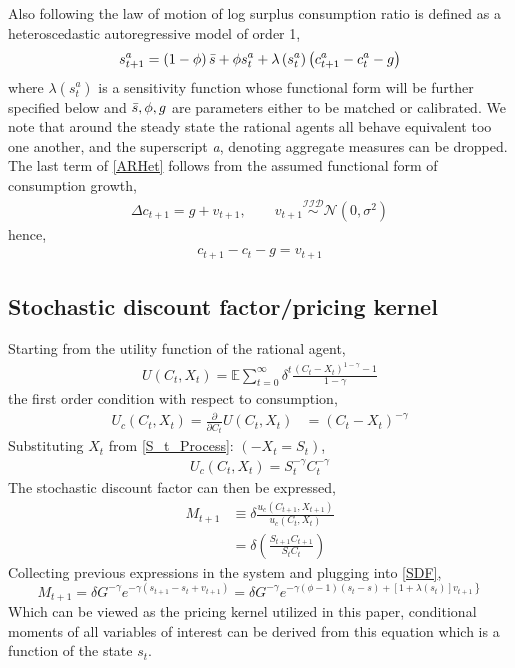 Also following \citet{Campbell1999} the law of motion of log surplus consumption ratio is defined as a heteroscedastic autoregressive model of order 1,
\begin{align}
    s_{t+1}^a  = \left( 1-\phi  \right)\Bar{s}+ \phi s_t ^ a + \lambda \left( s_t ^a  \right)\left( c_{t+1}^a - c_t^a - g\right) \label{ARHet}
\end{align}
where $\lambda(s_t^a)$ is a sensitivity function whose functional form will be further specified below and $\Bar{s},\phi, g$ are parameters either to be matched or calibrated. We note that around the steady state the rational agents all behave equivalent too one another, and the superscript \textit{a}, denoting aggregate measures can be dropped.
The last term of \eqref{ARHet} follows from the assumed functional form of consumption growth,
\begin{align}
    \Delta c_{t+1} = g + v_{t+1}, \qquad v_{t+1}\overset{\mathcal{IID}}{\sim}\mathcal{N}\left(0, \sigma^2 \right) \label{DConos}
\end{align}
hence,
\begin{align}
     c_{t+1} - c_t - g = v_{t+1}
\end{align}
\subsection{Stochastic discount factor/pricing kernel}
Starting from the utility function of the rational agent,
\begin{align*}
    U(C_t, X_t) = \mathbb{E} \sum _ {t = 0} ^{\infty} \delta ^ t \frac{\left( C_t - X_t\right)^{1-\gamma } - 1}{1-\gamma }
\end{align*}
the first order condition with respect to consumption,
\begin{align*}
    U_c \left( C_t, X_t \right) = \frac{\partial}{\partial C_t} U(C_t, X_t) & = \left( C_t - X_t\right)^{-\gamma}
\end{align*}
Substituting $X_t$ from \eqref{S_t_Process}:  $(-X_t = S_t)$,
\begin{align}
     U_c \left( C_t, X_t \right) = S_t ^{-\gamma} C_t ^{-\gamma}
\end{align}
The stochastic discount factor can then be expressed,
\begin{align}
    M_{t+1} & \equiv  \delta \frac{u_c\left( C_{t+1}, X_{t+1} \right)}{u_c\left( C_{t}, X_{t} \right)} \nonumber \\
    & = \delta \left( \frac{S_{t+1} C_{t+1}}{S_t C_t} \right) \label{SDF}
\end{align}
Collecting previous expressions in the system and plugging into \eqref{SDF},
\begin{equation}
M_{t+1}=\delta G^{-\gamma} e^{-\gamma\left(s_{t+1}-s_{t}+v_{t+1}\right)}=\delta G^{-\gamma} e^{\left.-\gamma(\phi-1)\left(s_{t}-s\right)+\left[1+\lambda\left(s_{t}\right)\right] v_{t+1}\right\}}
\end{equation}
Which can be viewed as the pricing kernel utilized in this paper, conditional moments of all variables of interest can be derived from this equation which is a function of the state $s_t$.

